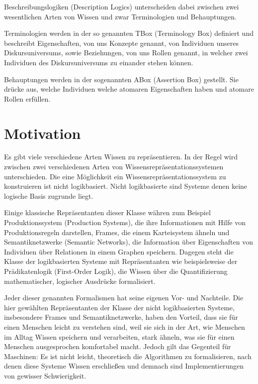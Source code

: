 \documentclass[runningheads,a4paper]{llncs}
\begin{document}
Beschreibungslogiken (Description Logics) unterscheiden dabei zwischen zwei wesentlichen Arten von Wissen und zwar Terminologien und Behauptungen.

 Terminologien werden in der so genannten TBox (Terminology Box) definiert und beschreibt Eigenschaften, von uns Konzepte genannt, von Individuen unseres Diskursuniversums, sowie Beziehungen, von uns Rollen genannt, in welcher zwei Individuen des Diskursuniversums zu einander stehen können. 

Behauptungen werden in der sogenannten ABox (Assertion Box) gestellt. Sie drücke aus, welche Individuen welche atomaren Eigenschaften haben und atomare Rollen erfüllen.



\section{Motivation}

Es gibt viele verschiedene Arten Wissen zu repräsentieren. In der Regel wird zwischen zwei verschiedenen Arten von Wissensrepräsentationssystemen unterschieden. Die eine Möglichkeit ein Wissensrepräsentationssystem zu konstruieren ist nicht logikbasiert. Nicht logikbasierte sind Systeme denen keine logische Basis zugrunde liegt.

 Einige klassische Repräsentanten dieser Klasse währen zum Beispiel Produktionssystem (Production Systems), die ihre Informationen mit Hilfe von Produktionsregeln darstellen, Frames, die einem Karteisystem ähneln und Semantiknetzwerke (Semantic Networks), die Information über Eigenschaften von Individuen über Relationen in einem Graphen speichern. Dagegen steht die Klasse der logikbasierten Systeme mit Repräsentanten wie beispielsweise der Prädikatenlogik (First-Order Logik), die Wissen über die Quantifizierung mathematischer, logischer Ausdrücke formalisiert.

Jeder dieser genannten Formalismen hat seine eigenen Vor- und Nachteile. Die hier gewählten Repräsentanten der Klasse der nicht logikbasierten Systeme, insbesondere Frames und Semantiknetzwerke, haben den Vorteil, dass sie für einen Menschen leicht zu verstehen sind, weil sie sich in der Art, wie Menschen im Alltag Wissen speichern und verarbeiten, stark ähneln, was sie für einen Menschen ausgesprochen komfortabel macht. Jedoch gilt das Gegenteil für Maschinen: Es ist nicht leicht, theoretisch die Algorithmen zu formalisieren, nach denen diese Systeme Wissen erschließen und demnach sind Implementierungen von gewisser Schwierigkeit.
\end{document}

